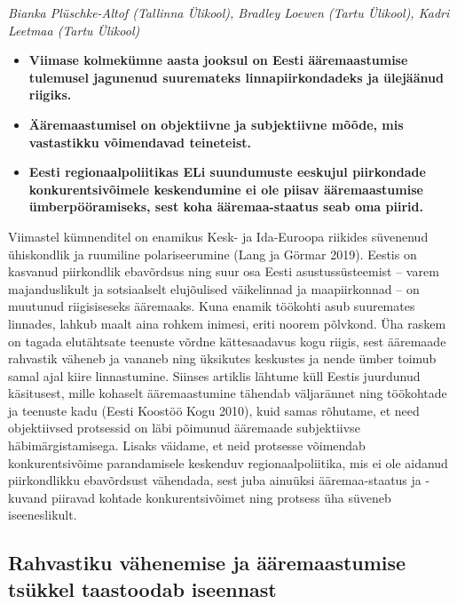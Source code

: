 \documentclass[]{book}
\begin{document}
\emph{Bianka Plüschke-Altof (Tallinna Ülikool), Bradley Loewen (Tartu Ülikool), Kadri Leetmaa (Tartu Ülikool)}

\begin{itemize}
\item
  \textbf{Viimase kolmekümne aasta jooksul on Eesti ääremaastumise tulemusel jagunenud suuremateks linnapiirkondadeks ja ülejäänud riigiks.}
\item
  \textbf{Ääremaastumisel on objektiivne ja subjektiivne mõõde, mis vastastikku võimendavad teineteist.}
\item
  \textbf{Eesti regionaalpoliitikas ELi suundumuste eeskujul piirkondade konkurentsivõimele keskendumine ei ole piisav ääremaastumise ümberpööramiseks, sest koha ääremaa-staatus seab oma piirid.}
\end{itemize}

Viimastel kümnenditel on enamikus Kesk- ja Ida-Euroopa riikides süvenenud ühiskondlik ja ruumiline
polariseerumine (Lang ja Görmar 2019). Eestis on kasvanud piirkondlik ebavõrdsus ning suur osa Eesti
asustussüsteemist -- varem majanduslikult ja sotsiaalselt elujõulised väikelinnad ja maapiirkonnad -- on
muutunud riigisiseseks ääremaaks. Kuna enamik töökohti asub suuremates linnades, lahkub maalt aina
rohkem inimesi, eriti noorem põlvkond. Üha raskem on tagada elutähtsate teenuste võrdne kättesaadavus
kogu riigis, sest ääremaade rahvastik väheneb ja vananeb ning üksikutes keskustes ja nende ümber toimub
samal ajal kiire linnastumine. Siinses artiklis lähtume küll Eestis juurdunud käsitusest, mille kohaselt
ääremaastumine tähendab väljarännet ning töökohtade ja teenuste kadu (Eesti Koostöö Kogu 2010), kuid
samas rõhutame, et need objektiivsed protsessid on läbi põimunud ääremaade subjektiivse
häbimärgistamisega. Lisaks väidame, et neid protsesse võimendab konkurentsivõime parandamisele
keskenduv regionaalpoliitika, mis ei ole aidanud piirkondlikku ebavõrdsust vähendada, sest juba ainuüksi
ääremaa-staatus ja -kuvand piiravad kohtade konkurentsivõimet ning protsess üha süveneb iseeneslikult.

\hypertarget{rahvastiku-vahenemise-ja-aaremaastumise-tsukkel-taastoodab-iseennast}{%
\subsection{Rahvastiku vähenemise ja ääremaastumise tsükkel taastoodab iseennast}\label{rahvastiku-vahenemise-ja-aaremaastumise-tsukkel-taastoodab-iseennast}}
\end{document}
